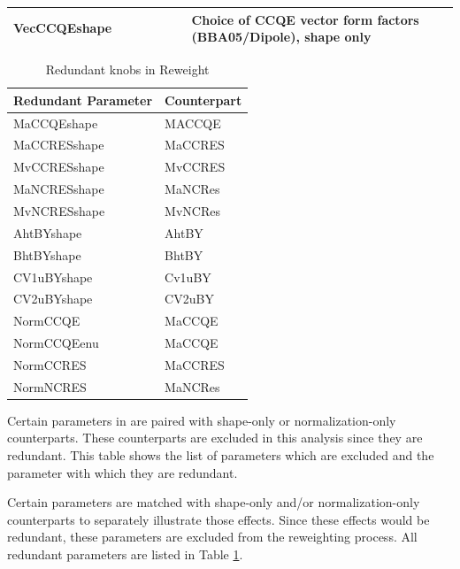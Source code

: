 {\begin{longtable}{|p{0.4\linewidth}|p{0.6\linewidth}|}
 VecCCQEshape & Choice of CCQE vector form factors (BBA05/Dipole), shape only  \\ \hline
\end{longtable}
{
\label{genie_reweight_knobs}
}
\clearpage

\begin{table}
\begin{center}
\begin{tabular}{|l|l|}
\hline
\textbf{Redundant Parameter} & \textbf{Counterpart} \\ \hline
MaCCQEshape &  MACCQE \\ \hline
MaCCRESshape &  MaCCRES \\ \hline
MvCCRESshape &  MvCCRES \\ \hline
MaNCRESshape &  MaNCRes  \\ \hline
MvNCRESshape &  MvNCRes \\ \hline
AhtBYshape &  AhtBY \\ \hline
BhtBYshape &  BhtBY \\ \hline
CV1uBYshape &  Cv1uBY\\ \hline
CV2uBYshape &  CV2uBY \\ \hline
NormCCQE &  MaCCQE\\ \hline
NormCCQEenu &  MaCCQE\\ \hline
NormCCRES &  MaCCRES \\ \hline
NormNCRES &  MaNCRes\\ \hline
\end{tabular}
\end{center}
\caption{Redundant knobs in \genie Reweight}{
Certain parameters in \genie are paired with shape-only or normalization-only
counterparts.
These counterparts are excluded in this analysis since they are redundant.
This table shows the list of parameters which are excluded and the parameter
with which they are redundant.
}
\label{redundant_genie_knobs}
\end{table}

Certain parameters are matched with shape-only
and/or normalization-only counterparts to separately illustrate
those effects.
Since these effects would be redundant, these parameters
are excluded from the reweighting process.
All redundant parameters are listed in Table
\ref{redundant_genie_knobs}.


}
